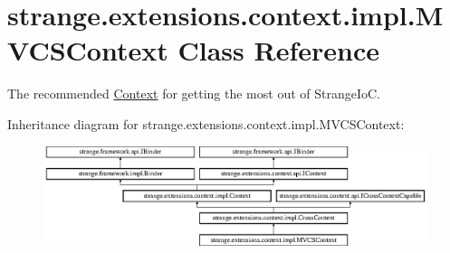 \hypertarget{classstrange_1_1extensions_1_1context_1_1impl_1_1_m_v_c_s_context}{\section{strange.\-extensions.\-context.\-impl.\-M\-V\-C\-S\-Context Class Reference}
\label{classstrange_1_1extensions_1_1context_1_1impl_1_1_m_v_c_s_context}
}


The recommended \hyperlink{classstrange_1_1extensions_1_1context_1_1impl_1_1_context}{Context} for getting the most out of Strange\-Io\-C.  


Inheritance diagram for strange.\-extensions.\-context.\-impl.\-M\-V\-C\-S\-Context\-:\begin{figure}[H]
\begin{center}
\leavevmode
\includegraphics[height=2.925810cm]{classstrange_1_1extensions_1_1context_1_1impl_1_1_m_v_c_s_context}
\end{center}
\end{figure}
